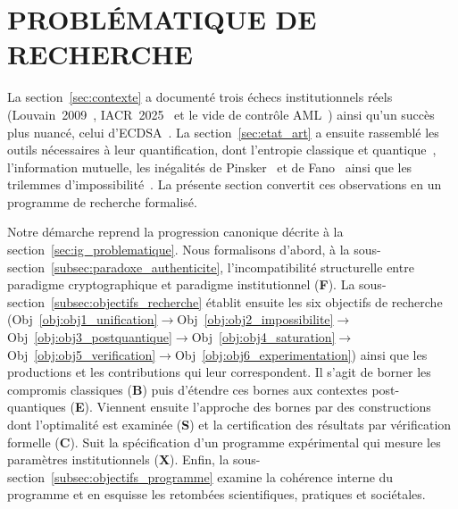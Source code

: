 
\section{PROBL\'EMATIQUE DE RECHERCHE}
\label{sec:problematique}
\begin{sloppypar}
La section~\ref{sec:contexte} a
document\'e trois \'echecs institutionnels r\'eels (Louvain~2009~\cite{Adida09UCL},
IACR~2025~\cite{IACR2025incident} et le vide de contr\^ole AML~\cite{FATF12,AMLD4}) ainsi qu'un succ\`es plus nuanc\'e, celui d'ECDSA~\cite{Johnson01,NIST.FIPS.186-5}.
La section~\ref{sec:etat_art} a ensuite rassembl\'e les outils n\'ecessaires
\`a leur quantification, dont l'entropie classique et quantique~\cite{Shannon48,NielsenChuang2010}, l'information mutuelle,
les in\'egalit\'es de Pinsker~\cite{Pinsker1964} et de Fano~\cite{Fano61} ainsi que les trilemmes d'impossibilit\'e~\cite{Arrow50,Brewer00,FLP85}. La pr\'esente section convertit ces observations en un programme de recherche
formalis\'e.

Notre d\'emarche reprend la progression canonique d\'ecrite \`a la section~\ref{sec:ig_problematique}.
Nous formalisons d'abord, \`a la sous-section~\ref{subsec:paradoxe_authenticite},
l'incompatibilit\'e structurelle entre paradigme cryptographique et
paradigme institutionnel (\textbf{F}). La
sous-section~\ref{subsec:objectifs_recherche} \'etablit ensuite les six
objectifs de recherche (Obj~\ref{obj:obj1_unification}$\to$Obj~\ref{obj:obj2_impossibilite}$\to$Obj~\ref{obj:obj3_postquantique}$\to$Obj~\ref{obj:obj4_saturation}$\to$Obj~\ref{obj:obj5_verification}$\to$Obj~\ref{obj:obj6_experimentation}) ainsi que les productions et les contributions qui leur
correspondent. Il s'agit de borner les compromis classiques (\textbf{B}) puis
d'\'etendre ces bornes aux contextes post-quantiques (\textbf{E}). Viennent
ensuite l'approche des bornes par des constructions dont l'optimalit\'e
est examin\'ee (\textbf{S}) et la certification des r\'esultats par v\'erification formelle
(\textbf{C}). Suit la sp\'ecification d'un programme exp\'erimental qui mesure les
param\`etres institutionnels (\textbf{X}). Enfin, la sous-section~\ref{subsec:objectifs_programme} examine
la coh\'erence interne du programme et en esquisse les retomb\'ees scientifiques,
pratiques et soci\'etales.
\end{sloppypar}

